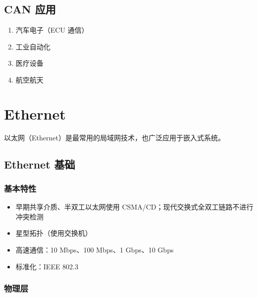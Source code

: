 \subsection{CAN 应用}

\begin{enumerate}
  \item 汽车电子（ECU 通信）
  \item 工业自动化
  \item 医疗设备
  \item 航空航天
\end{enumerate}

\section{Ethernet}

以太网（Ethernet）是最常用的局域网技术，也广泛应用于嵌入式系统。

\subsection{Ethernet 基础}

\subsubsection{基本特性}

\begin{itemize}
  \item 早期共享介质、半双工以太网使用 CSMA/CD；现代交换式全双工链路不进行冲突检测
  \item 星型拓扑（使用交换机）
  \item 高速通信：10 Mbps、100 Mbps、1 Gbps、10 Gbps
  \item 标准化：IEEE 802.3
\end{itemize}

\subsubsection{物理层}

